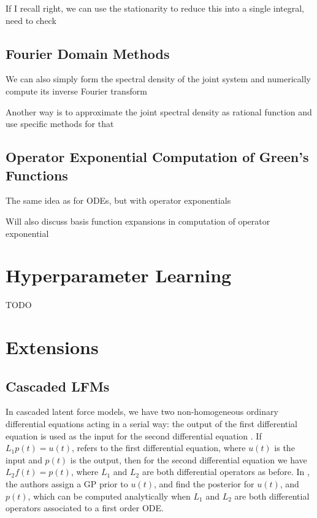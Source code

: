 \documentclass[journal]{IEEEtran}
\newcommand{\simo}[1]{{\color{red}#1}}
\begin{document}
\simo{If I recall right, we can use the stationarity to reduce this into a single integral, need to check}

\subsection{Fourier Domain Methods}
%
\simo{We can also simply form the spectral density of the joint system and numerically compute its inverse Fourier transform}

\simo{Another way is to approximate the joint spectral density as rational function and use specific methods for that}

\subsection{Operator Exponential Computation of Green's Functions}

\simo{The same idea as for ODEs, but with operator exponentials}

\simo{Will also discuss basis function expansions in computation of operator exponential}



\section{Hyperparameter Learning}
%
\simo{TODO}


\section{Extensions}

\subsection{Cascaded LFMs}

In cascaded latent force models, we have two non-homogeneous ordinary differential equations acting in a serial way:
the output of the first differential equation is used as the input for the second differential equation
\cite{Honkela:PNAS10}. If $L_1p(t) = u(t)$, refers to the first differential equation,
where $u(t)$ is the input and $p(t)$ is the output, then for the second differential equation we have $L_2f(t) = p(t)$,
where $L_1$ and $L_2$ are both differential operators as before. In \cite{Honkela:PNAS10}, the authors assign a
GP prior to $u(t)$, and find the posterior for $u(t)$, and $p(t)$, which can be computed analytically when $L_1$ and $L_2$
are both differential operators associated to a first order ODE.
\end{document}
